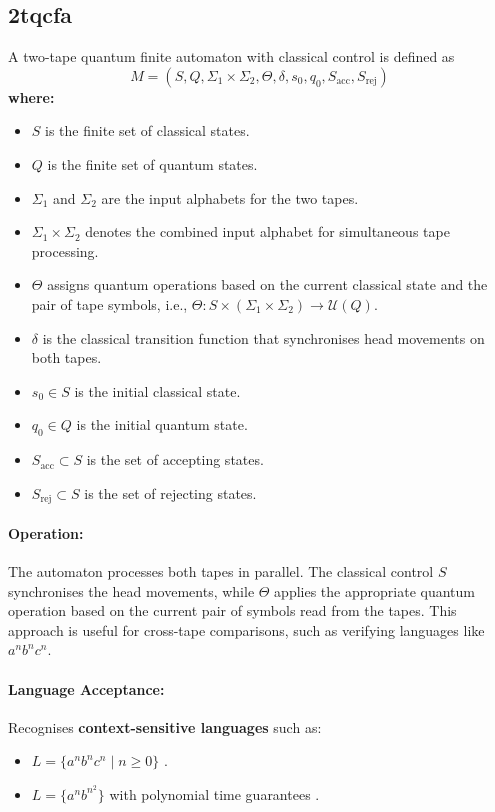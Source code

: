 \subsection{\acrfull{2tqcfa}}
\label{subsec:2tqcfa}
\begin{definition}
A two-tape quantum finite automaton with classical control is defined as 
\[
M = (S, Q, \Sigma_1 \times \Sigma_2, \Theta, \delta, s_0, q_0, S_{\text{acc}}, S_{\text{rej}})
\]
\textbf{where:}
\begin{itemize}
    \item \( S \) is the finite set of classical states.
    \item \( Q \) is the finite set of quantum states.
    \item \( \Sigma_1 \) and \( \Sigma_2 \) are the input alphabets for the two tapes.
    \item \( \Sigma_1 \times \Sigma_2 \) denotes the combined input alphabet for simultaneous tape processing.
    \item \( \Theta \) assigns quantum operations based on the current classical state and the pair of tape symbols, i.e., \(\Theta: S \times (\Sigma_1 \times \Sigma_2) \to \mathcal{U}(Q)\).
    \item \( \delta \) is the classical transition function that synchronises head movements on both tapes.
    \item \( s_0 \in S \) is the initial classical state.
    \item \( q_0 \in Q \) is the initial quantum state.
    \item \( S_{\text{acc}} \subset S \) is the set of accepting states.
    \item \( S_{\text{rej}} \subset S \) is the set of rejecting states.
\end{itemize}
\end{definition}

\paragraph{Operation:}  
The automaton processes both tapes in parallel. The classical control \( S \) synchronises the head movements, while \( \Theta \) applies the appropriate quantum operation based on the current pair of symbols read from the tapes. This approach is useful for cross-tape comparisons, such as verifying languages like \( a^n b^n c^n \).

\paragraph{Language Acceptance:}  
Recognises \textbf{context-sensitive languages} such as:
\begin{itemize}
    \item \( L = \{a^n b^n c^n \mid n \geq 0\} \) \cite{zheng2012two}.
    \item \( L = \{a^n b^{n^2}\} \) with polynomial time guarantees \cite{zheng2012two}.
\end{itemize}

